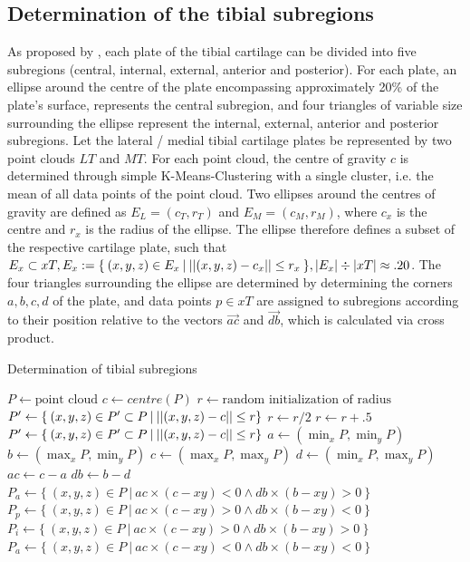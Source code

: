 \subsection{Determination of the tibial subregions}
As proposed by \cite{wirth2008technique}, each plate of the tibial cartilage can be divided into five subregions (central, internal, external, anterior and posterior).
For each plate, an ellipse around the centre of the plate encompassing approximately 20\% of the plate's surface, represents the central subregion, and four triangles of variable size surrounding the ellipse represent the internal, external, anterior and posterior subregions. Let the lateral / medial tibial cartilage plates be represented by two point clouds $LT$ and $MT$. For each point cloud, the centre of gravity $c$ is determined through simple K-Means-Clustering with a single cluster, i.e. the mean of all data points of the point cloud. Two ellipses around the centres of gravity are defined as $E_L = (c_T, r_T)$ and $E_M = (c_M, r_M)$, where $c_x$ is the centre and $r_x$ is the radius of the ellipse. The ellipse therefore defines a subset of the respective cartilage plate, such that $E_x \subset xT, E_x := \{\:(x,y,z) \in E_x \:|\: \lvert \lvert (x,y,z) - c_x \rvert \rvert \leq r_x\:\}, \lvert E_x \rvert \div \lvert xT \rvert \approx .20$. The four triangles surrounding the ellipse are determined by determining the corners $a, b, c, d$ of the plate, and data points $p \in xT$ are assigned to subregions according to their position relative to the vectors $\vec{ac}$ and $\vec{db}$, which is calculated via cross product.
\begin{algorithm}
	\caption{Determination of tibial subregions}
	\label{algo:tibialRegions}
	\begin{algorithmic}[1]
		\State $P \gets \text{point cloud}$
		\State $c \gets centre(P)$
		\State $r \gets \text{random initialization of radius}$
		\State $P' \gets \{\:(x,y,z) \in P' \subset P \:|\: \lvert \lvert (x,y,z) - c \rvert \rvert \leq r\}$
		\Repeat
				\State $r \gets r / 2$
			\Else
				\State $r \gets r + .5$
			\EndIf
			\State $P' \gets \{\:(x,y,z) \in P' \subset P \:|\: \lvert \lvert (x,y,z) - c \rvert \rvert \leq r\}$
		\State $a \gets (\min_{x} P, \min_{y} P)$
		\State $b \gets (\max_{x} P, \min_{y} P)$
		\State $c \gets (\max_{x} P, \max_{y} P)$
		\State $d \gets (\min_{x} P, \max_{y} P)$
		\State $ac \gets c - a$
		\State $db \gets b - d$
		\State $P_a \gets \{\:(x,y,z) \in P \:|\: ac \times (c - xy)  < 0 \land db \times (b - xy) > 0\:\}$
		\State $P_p \gets \{\:(x,y,z) \in P \:|\: ac \times (c - xy)  > 0 \land db \times (b - xy) < 0\:\}$
		\State $P_i \gets \{\:(x,y,z) \in P \:|\: ac \times (c - xy)  > 0 \land db \times (b - xy) > 0\:\}$ 
		\State $P_a \gets \{\:(x,y,z) \in P \:|\: ac \times (c - xy)  < 0 \land db \times (b - xy) < 0\:\}$ 
		\EndProcedure
	\end{algorithmic}
\end{algorithm}
